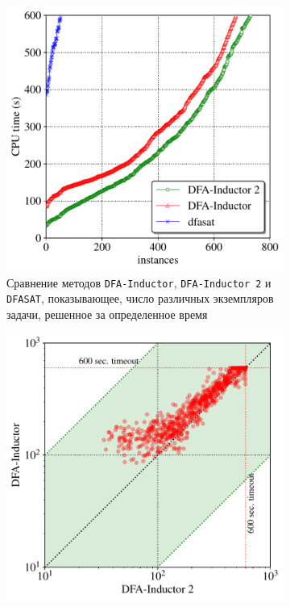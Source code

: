 \begin{figure}[ht]
  \centering
  \begin{subfigure}[b]{0.48\textwidth}
    \centering
    \includegraphics[width=\textwidth]{img/lata19/plots/cactus}
    \caption{Сравнение методов \texttt{DFA-Inductor}, \texttt{DFA-Inductor~2} и \texttt{DFASAT}, показывающее, число различных экземпляров задачи, решенное за определенное время}
    \label{syn:img:plots:cactus}
  \end{subfigure}%
  \;\;
  \begin{subfigure}[b]{0.48\textwidth}
    \centering
    \includegraphics[width=\textwidth]{img/lata19/plots/scatter}

\end{subfigure}
\end{figure}
